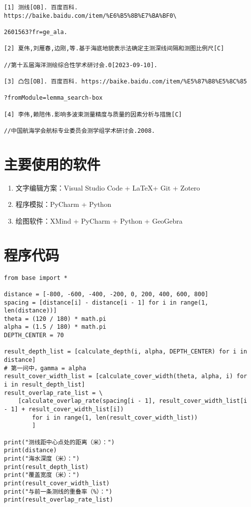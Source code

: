 

\begin{verbatim}
[1] 测线[OB]. 百度百科. https://baike.baidu.com/item/%E6%B5%8B%E7%BA%BF0\

2601563?fr=ge_ala.

[2] 夏伟,刘雁春,边刚,等.基于海底地貌表示法确定主测深线间隔和测图比例尺[C]

//第十五届海洋测绘综合性学术研讨会.0[2023-09-10].

[3] 凸包[OB]. 百度百科. https://baike.baidu.com/item/%E5%87%B8%E5%8C%85

?fromModule=lemma_search-box

[4] 李伟,赖陪伟.影响多波束测量精度与质量的因素分析与措施[C]

//中国航海学会航标专业委员会测学组学术研讨会.2008.

\end{verbatim}


\appendix
\section{主要使用的软件}

\begin{enumerate}
    \item 文字编辑方案：Visual Studio Code + \LaTeX + Git + Zotero
    \item 程序模拟：PyCharm + Python
    \item 绘图软件：XMind + PyCharm + Python + GeoGebra
\end{enumerate}

\section{程序代码}

\begin{lstlisting}[caption={question1.py}]
from base import *

distance = [-800, -600, -400, -200, 0, 200, 400, 600, 800]
spacing = [distance[i] - distance[i - 1] for i in range(1, len(distance))]
theta = (120 / 180) * math.pi
alpha = (1.5 / 180) * math.pi
DEPTH_CENTER = 70

result_depth_list = [calculate_depth(i, alpha, DEPTH_CENTER) for i in distance]
# 第一问中，gamma = alpha
result_cover_width_list = [calculate_cover_width(theta, alpha, i) for i in result_depth_list]
result_overlap_rate_list = \
    [calculate_overlap_rate(spacing[i - 1], result_cover_width_list[i - 1] + result_cover_width_list[i])
        for i in range(1, len(result_cover_width_list))
        ]

print("测线距中心点处的距离（米）：")
print(distance)
print("海水深度（米）：")
print(result_depth_list)
print("覆盖宽度（米）：")
print(result_cover_width_list)
print("与前一条测线的重叠率（%）：")
print(result_overlap_rate_list)
\end{lstlisting}

